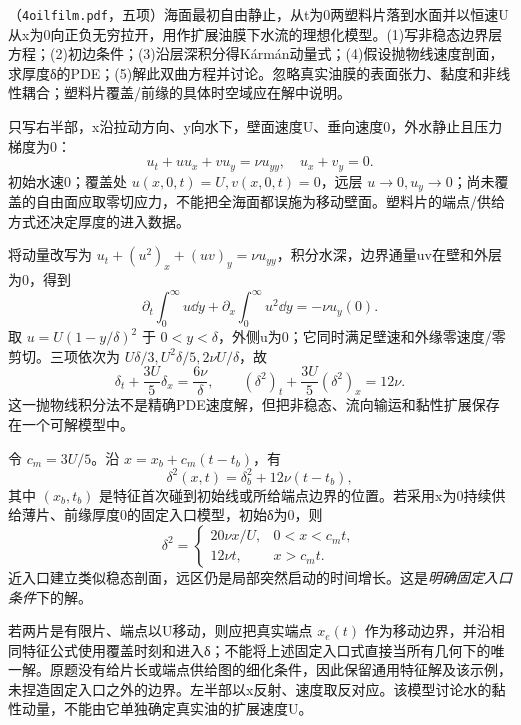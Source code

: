 \begin{exercise}\label{task:fluid-oilfilm}
（\texttt{4oilfilm.pdf}，五项）海面最初自由静止，从t为0两塑料片落到水面并以恒速U从x为0向正负无穷拉开，用作扩展油膜下水流的理想化模型。(1)写非稳态边界层方程；(2)初边条件；(3)沿层深积分得Kármán动量式；(4)假设抛物线速度剖面，求厚度δ的PDE；(5)解此双曲方程并讨论。忽略真实油膜的表面张力、黏度和非线性耦合；塑料片覆盖/前缘的具体时空域应在解中说明。
\end{exercise}
\begin{solution}
只写右半部，x沿拉动方向、y向水下，壁面速度U、垂向速度0，外水静止且压力梯度为0：
\[
 u_t+uu_x+vu_y=\nu u_{yy},\quad u_x+v_y=0.
\]
初始水速0；覆盖处 $u(x,0,t)=U,v(x,0,t)=0$，远层 $u\to0,u_y\to0$；尚未覆盖的自由面应取零切应力，不能把全海面都误施为移动壁面。塑料片的端点/供给方式还决定厚度的进入数据。

将动量改写为 $u_t+(u^2)_x+(uv)_y=\nu u_{yy}$，积分水深，边界通量uv在壁和外层为0，得到
\[
 \partial_t\int_0^\infty u\dd y+\partial_x\int_0^\infty u^2\dd y=-\nu u_y(0).
\]
取 $u=U(1-y/\delta)^2$ 于 $0<y<\delta$，外侧u为0；它同时满足壁速和外缘零速度/零剪切。三项依次为 $U\delta/3,U^2\delta/5,2\nu U/\delta$，故
\[
 \delta_t+\frac{3U}{5}\delta_x=\frac{6\nu}{\delta},\qquad
 (\delta^2)_t+\frac{3U}{5}(\delta^2)_x=12\nu.
\]
这一抛物线积分法不是精确PDE速度解，但把非稳态、流向输运和黏性扩展保存在一个可解模型中。

令 $c_m=3U/5$。沿 $x=x_b+c_m(t-t_b)$，有
\[
 \delta^2(x,t)=\delta_b^2+12\nu(t-t_b),
\]
其中 $(x_b,t_b)$ 是特征首次碰到初始线或所给端点边界的位置。若采用x为0持续供给薄片、前缘厚度0的固定入口模型，初始δ为0，则
\[
 \delta^2=\begin{cases}20\nu x/U,&0<x<c_mt,\\12\nu t,&x>c_mt.\end{cases}
\]
近入口建立类似稳态剖面，远区仍是局部突然启动的时间增长。这是\emph{明确固定入口条件}下的解。

若两片是有限片、端点以U移动，则应把真实端点 $x_e(t)$ 作为移动边界，并沿相同特征公式使用覆盖时刻和进入δ；不能将上述固定入口式直接当所有几何下的唯一解。原题没有给片长或端点供给图的细化条件，因此保留通用特征解及该示例，未捏造固定入口之外的边界。左半部以x反射、速度取反对应。该模型讨论水的黏性动量，不能由它单独确定真实油的扩展速度U。
\end{solution}

